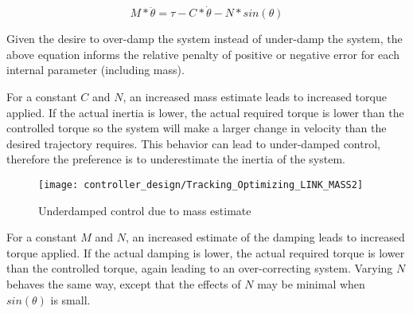\begin{equation}
M * \ddot{\theta} = \tau - C * \dot{\theta} - N * sin(\theta)
\end{equation}

Given the desire to over-damp the system instead of under-damp the system, the
above equation informs the relative penalty of positive or negative error for
each internal parameter (including mass).

For a constant $C$ and $N$, an increased mass estimate leads to increased torque
applied. If the actual inertia is lower, the actual required torque is lower 
than the controlled torque so the system will make a larger change in velocity 
than the desired trajectory requires. This behavior can lead to under-damped 
control, therefore the preference is to underestimate the inertia of the system.

\begin{figure}
\centering
\texttt{[image: controller\_design/Tracking\_Optimizing\_LINK\_MASS2]}
\caption{Underdamped control due to mass estimate}
\label{fig:UnderdampedControl}
\end{figure}


For a constant $M$ and $N$, an increased estimate of the damping leads to 
increased torque applied. If the actual damping is lower, the actual required
torque is lower than the controlled torque, again leading to an over-correcting
system. Varying $N$ behaves the same way, except that the effects of $N$ may be
minimal when $sin(\theta)$ is small.
